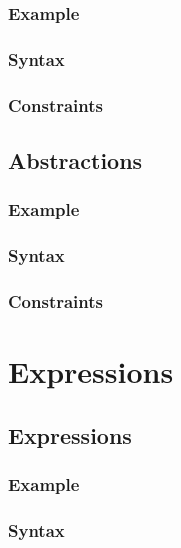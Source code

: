 \documentclass[a4paper,oneside,12pt, extrafontsizes]{memoir}
\begin{document}
\section{Example}


\section{Syntax}


\section{Constraints}


\chapter{Abstractions}
\label{ch:abstract}


\section{Example}


\section{Syntax}


\section{Constraints}


\part{Expressions}

\chapter{Expressions}
\label{ch:expressions}


\section{Example}


\section{Syntax}

\end{document}
